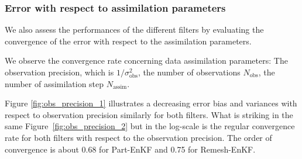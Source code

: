 \newpage

\subsubsection{Error with respect to assimilation parameters}
We also assess the performances of the different filters by evaluating the convergence of the error with respect to the assimilation parameters.

We observe the convergence rate concerning data assimilation parameters: The observation precision, which is \(1/\sigma_{\text{obs}}^2\), the number of observations \(N_{\text{obs}}\), the number of assimilation step \(N_{\text{assim}}\).

Figure \ref{fig:obs_precision_1} illustrates a decreasing error bias and variances with respect to observation precision similarly for both filters. What is striking in the same Figure~\ref{fig:obs_precision_2} but in the log-scale is the regular convergence rate for both filters with respect to the observation precision. The order of convergence is about 0.68 for Part-EnKF and 0.75 for Remesh-EnKF.

